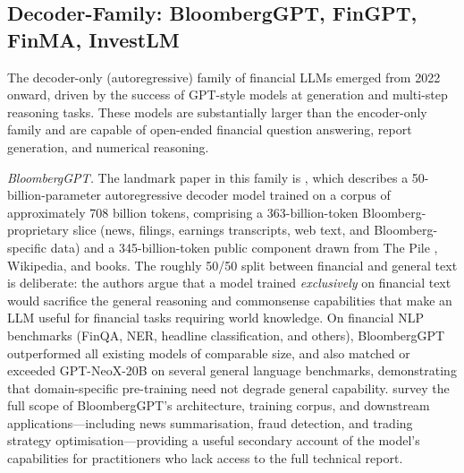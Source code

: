 \subsection{Decoder-Family: BloombergGPT, FinGPT, FinMA, InvestLM}
\label{sec:ch08-decoder-family}

The decoder-only (autoregressive) family of financial LLMs emerged from 2022
onward, driven by the success of GPT-style models at generation and multi-step
reasoning tasks.  These models are substantially larger than the encoder-only
family and are capable of open-ended financial question answering, report
generation, and numerical reasoning.

\textit{BloombergGPT.}  The landmark paper in this family is
\citet{wu2023bloomberggpt}, which describes a 50-billion-parameter autoregressive
decoder model trained on a corpus of approximately 708 billion tokens, comprising
a 363-billion-token Bloomberg-proprietary slice (news, filings, earnings
transcripts, web text, and Bloomberg-specific data) and a 345-billion-token
public component drawn from The Pile \cite{gao2020pile}, Wikipedia, and books.
The roughly 50/50 split between financial and general text is deliberate: the authors argue that
a model trained \emph{exclusively} on financial text would sacrifice the general
reasoning and commonsense capabilities that make an LLM useful for financial
tasks requiring world knowledge.  On financial NLP benchmarks (FinQA, NER,
headline classification, and others), BloombergGPT outperformed all existing
models of comparable size, and also matched or exceeded GPT-NeoX-20B on several
general language benchmarks, demonstrating that domain-specific pre-training need
not degrade general capability.  \citet{Keshri2025} survey the full scope of
BloombergGPT's architecture, training corpus, and downstream applications---including
news summarisation, fraud detection, and trading strategy optimisation---providing
a useful secondary account of the model's capabilities for practitioners who lack
access to the full technical report.

